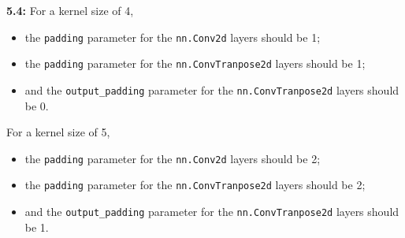 \documentclass[12pt]{article}
\begin{document}
\textbf{5.4:} For a kernel size of 4, \begin{itemize}
    \item the \texttt{padding} parameter for the \texttt{nn.Conv2d} layers should be 1;
    \item the \texttt{padding} parameter for the \texttt{nn.ConvTranpose2d} layers should be 1;
    \item and the \texttt{output\_padding} parameter for the \texttt{nn.ConvTranpose2d} layers should be 0.
\end{itemize} For a kernel size of 5, \begin{itemize}
    \item the \texttt{padding} parameter for the \texttt{nn.Conv2d} layers should be 2;
    \item the \texttt{padding} parameter for the \texttt{nn.ConvTranpose2d} layers should be 2;
    \item and the \texttt{output\_padding} parameter for the \texttt{nn.ConvTranpose2d} layers should be 1.
\end{itemize}
\end{document}

